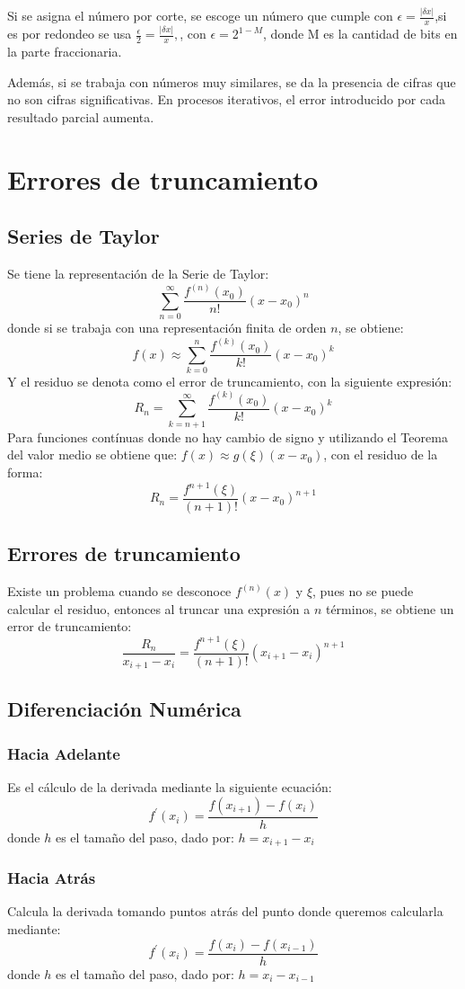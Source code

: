 \documentclass[letterpaper, 12pt, twoside]{article}
\begin{document}
	Si se asigna el número por corte, se escoge un número que cumple con $\epsilon = \frac{|\delta x |}{x}$,si  es por redondeo se usa $\frac{\epsilon}{2} = \frac{|\delta x |}{x},$, con $\epsilon = 2^{1-M}$, donde M es la cantidad de bits en la parte fraccionaria.
	\bigskip
	
	Además,  si  se  trabaja  con  números  muy  similares,  se  da  la  presencia  de  cifras  que  no
	son cifras significativas.  En procesos iterativos, el error introducido por cada resultado
	parcial aumenta.
	\section{Errores de truncamiento}
	\subsection{Series de Taylor}
	Se tiene la representación de la Serie de Taylor: $$\sum_{n=0}^{\infty}\frac{f^{(n)}(x_0)}{n!}(x-x_0)^n$$donde si se trabaja con una representación finita de orden $n$, se obtiene: $$f(x)\approx \sum_{k=0}^{n}\frac{f^{(k)}(x_0)}{k!}(x-x_0)^k $$Y el residuo se denota como el error de truncamiento, con la siguiente expresión: $$R_n = \sum_{k=n+1}^{\infty}\frac{f^{(k)}(x_0)}{k!}(x-x_0)^k$$ Para funciones contínuas donde no hay cambio de signo y utilizando el Teorema del valor medio se obtiene que: $f(x) \approx g(\xi)(x-x_0)$, con el residuo de la forma: $$R_n = \frac{f^{n+1}(\xi)}{(n+1)!}(x-x_0)^{n+1}$$
	\subsection{Errores de truncamiento}
	Existe un problema cuando se desconoce $f^{(n)}(x)$ y $\xi$, pues no se puede calcular el residuo,
	entonces al truncar una expresión a $n$ términos, se obtiene un error de truncamiento: $$\frac{R_n}{x_{i+1}-x_i} = \frac{f^{n+1}(\xi)}{(n+1)!}(x_{i+1}-x_i)^{n+1}$$
	\subsection{Diferenciación Numérica}
	\subsubsection{Hacia Adelante}
	Es el cálculo de la derivada mediante la siguiente ecuación: $$f^{\prime}(x_i) = \frac{f(x_{i+1})-f(x_i)}{h}$$ donde $h$ es el tamaño del paso, dado por: $h = x_{i+1}-x_i$
	\subsubsection{Hacia Atrás}
	Calcula la derivada tomando puntos atrás del punto donde queremos calcularla mediante:$$f^{\prime}(x_i) = \frac{f(x_i)-f(x_{i-1})}{h}$$ donde $h$ es el tamaño del paso, dado por: $h = x_i -x_{i-1}$
\end{document}
